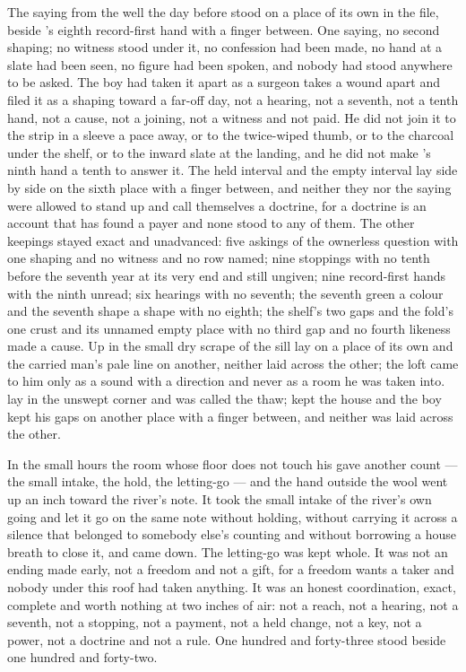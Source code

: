 The saying from the well the day before stood on a place of its own in the file, beside 's eighth record-first hand with a finger between. One saying, no second shaping; no witness stood under it, no confession had been made, no hand at a slate had been seen, no figure had been spoken, and nobody had stood anywhere to be asked. The boy had taken it apart as a surgeon takes a wound apart and filed it as a shaping toward a far-off day, not a hearing, not a seventh, not a tenth hand, not a cause, not a joining, not a witness and not paid. He did not join it to the strip in a sleeve a pace away, or to the twice-wiped thumb, or to the charcoal under the shelf, or to the inward slate at the landing, and he did not make 's ninth hand a tenth to answer it. The held interval and the empty interval lay side by side on the sixth place with a finger between, and neither they nor the saying were allowed to stand up and call themselves a doctrine, for a doctrine is an account that has found a payer and none stood to any of them. The other keepings stayed exact and unadvanced: five askings of the ownerless question with one shaping and no witness and no row named; nine stoppings with no tenth before the seventh year at its very end and still ungiven; nine record-first hands with the ninth unread; six hearings with no seventh; the seventh green a colour and the seventh shape a shape with no eighth; the shelf's two gaps and the fold's one crust and its unnamed empty place with no third gap and no fourth likeness made a cause. Up in  the small dry scrape of the sill lay on a place of its own and the carried man's pale line on another, neither laid across the other; the loft came to him only as a sound with a direction and never as a room he was taken into.  lay in the unswept corner and was called the thaw;  kept the house and the boy kept his gaps on another place with a finger between, and neither was laid across the other.

In the small hours the room whose floor does not touch his gave another count --- the small intake, the hold, the letting-go --- and the hand outside the wool went up an inch toward the river's note. It took the small intake of the river's own going and let it go on the same note without holding, without carrying it across a silence that belonged to somebody else's counting and without borrowing a house breath to close it, and came down. The letting-go was kept whole. It was not an ending made early, not a freedom and not a gift, for a freedom wants a taker and nobody under this roof had taken anything. It was an honest coordination, exact, complete and worth nothing at two inches of air: not a reach, not a hearing, not a seventh, not a stopping, not a payment, not a held change, not a key, not a power, not a doctrine and not a rule. One hundred and forty-three stood beside one hundred and forty-two.

